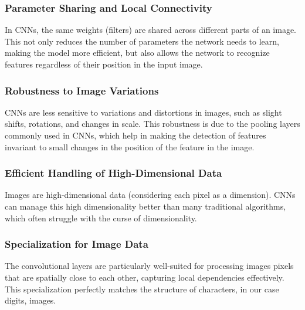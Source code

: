 \documentclass{article}
\begin{document}
\subsubsection{Parameter Sharing and Local Connectivity}
In CNNs, the same weights (filters) are shared across
different parts of an image. 
This not only reduces the number of parameters the network
needs to learn, making the model more efficient, 
but also allows the network to recognize features
regardless of their position in the input image.

\subsubsection{Robustness to Image Variations}
CNNs are less sensitive to variations and distortions 
in images, such as slight shifts, rotations, 
and changes in scale. 
This robustness is due to the pooling layers commonly used
in CNNs, which help in making the detection of features
invariant to small changes in the position of the feature
in the image.

\subsubsection{Efficient Handling of High-Dimensional Data}
Images are high-dimensional data 
(considering each pixel as a dimension). 
CNNs can manage this high dimensionality better 
than many traditional algorithms, 
which often struggle with the curse of dimensionality.

\subsubsection{Specialization for Image Data}
The convolutional layers are particularly well-suited 
for processing images pixels that are spatially close 
to each other, capturing local dependencies effectively.
This specialization perfectly matches the structure of 
characters, in our case digits, images.
\end{document}
